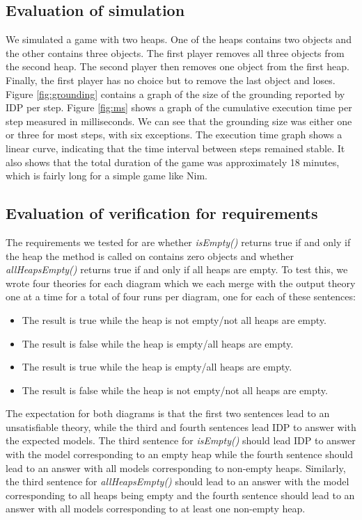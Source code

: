 \documentclass[conference]{IEEEtran}
\begin{document}
\subsection{Evaluation of simulation}

We simulated a game with two heaps. One of the heaps contains two objects and the other contains three objects. The first player removes all three objects from the second heap. The second player then removes one object from the first heap. Finally, the first player has no choice but to remove the last object and loses.
Figure \ref{fig:grounding} contains a graph of the size of the grounding reported by IDP per step. Figure \ref{fig:ms} shows a graph of the cumulative execution time per step measured in milliseconds. We can see that the grounding size was either one or three for most steps, with six exceptions. The execution time graph shows a linear curve, indicating that the time interval between steps remained stable. It also shows that the total duration of the game was approximately 18 minutes, which is fairly long for a simple game like Nim.

\subsection{Evaluation of verification for requirements}

The requirements we tested for are whether \textit{isEmpty()} returns true if and only if the heap the method is called on contains zero objects and whether \textit{allHeapsEmpty()} returns true if and only if all heaps are empty. To test this, we wrote four theories for each diagram which we each merge with the output theory one at a time for a total of four runs per diagram, one for each of these sentences:

\begin{itemize}
	\item The result is true while the heap is not empty/not all heaps are empty.
	\item The result is false while the heap is empty/all heaps are empty.
	\item The result is true while the heap is empty/all heaps are empty.
	\item The result is false while the heap is not empty/not all heaps are empty.
\end{itemize}

The expectation for both diagrams is that the first two sentences lead to an unsatisfiable theory, while the third and fourth sentences lead IDP to answer with the expected models. The third sentence for \textit{isEmpty()} should lead IDP to answer with the model corresponding to an empty heap while the fourth sentence should lead to an answer with all models corresponding to non-empty heaps. Similarly, the third sentence for \textit{allHeapsEmpty()} should lead to an answer with the model corresponding to all heaps being empty and the fourth sentence should lead to an answer with all models corresponding to at least one non-empty heap.
\end{document}
